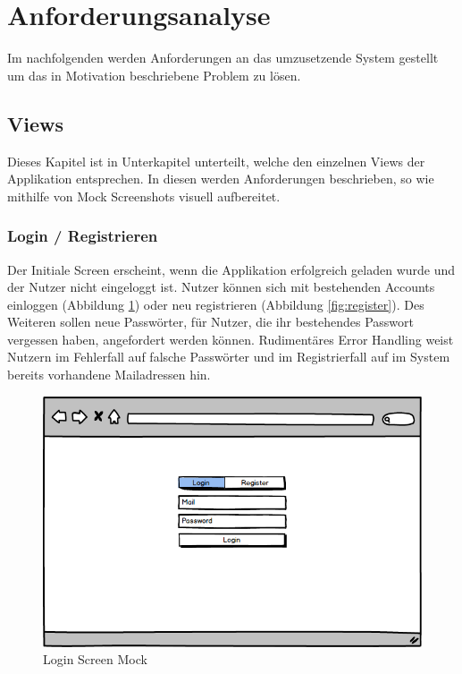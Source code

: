 \section{Anforderungsanalyse}

Im nachfolgenden werden Anforderungen an das umzusetzende System gestellt um das in Motivation beschriebene Problem zu lösen.

\subsection{Views}

Dieses Kapitel ist in Unterkapitel unterteilt, welche den einzelnen Views der Applikation \projectname{} entsprechen.
In diesen werden Anforderungen beschrieben, so wie mithilfe von Mock Screenshots visuell aufbereitet.

\subsubsection{Login / Registrieren}

Der Initiale Screen erscheint, wenn die Applikation erfolgreich geladen wurde und der Nutzer nicht eingeloggt ist.
Nutzer können sich mit bestehenden Accounts einloggen (Abbildung \ref{fig:login}) oder neu registrieren (Abbildung \ref{fig:register}).
Des Weiteren sollen neue Passwörter, für Nutzer, die ihr bestehendes Passwort vergessen haben, angefordert werden können.
Rudimentäres Error Handling weist Nutzern im Fehlerfall auf falsche Passwörter und im Registrierfall auf
im System bereits vorhandene Mailadressen hin.

\begin{figure}[h]
 \centering
 \includegraphics[width=0.7\linewidth]{kapitel1/mocks/Login.png}
 \caption{Login Screen Mock}
  \label{fig:login}
\end{figure}

